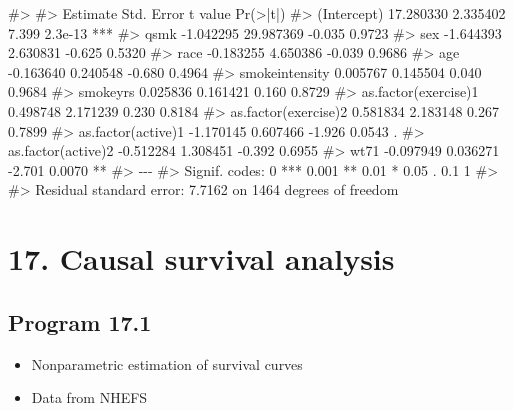 \documentclass[
  10pt,
  a4paper,
]{book}
\newenvironment{Shaded}{\begin{snugshade}}{\end{snugshade}}
\newcommand{\CommentTok}[1]{\textcolor[rgb]{0.37,0.37,0.37}{#1}}
\providecommand{\tightlist}{%
  \setlength{\itemsep}{0pt}\setlength{\parskip}{0pt}}
\begin{document}
\begin{Shaded}
\begin{Highlighting}[]
\CommentTok{\#\textgreater{} }
\CommentTok{\#\textgreater{}                       Estimate Std. Error t value Pr(\textgreater{}|t|)    }
\CommentTok{\#\textgreater{} (Intercept)          17.280330   2.335402   7.399  2.3e{-}13 ***}
\CommentTok{\#\textgreater{} qsmk                 {-}1.042295  29.987369  {-}0.035   0.9723    }
\CommentTok{\#\textgreater{} sex                  {-}1.644393   2.630831  {-}0.625   0.5320    }
\CommentTok{\#\textgreater{} race                 {-}0.183255   4.650386  {-}0.039   0.9686    }
\CommentTok{\#\textgreater{} age                  {-}0.163640   0.240548  {-}0.680   0.4964    }
\CommentTok{\#\textgreater{} smokeintensity        0.005767   0.145504   0.040   0.9684    }
\CommentTok{\#\textgreater{} smokeyrs              0.025836   0.161421   0.160   0.8729    }
\CommentTok{\#\textgreater{} as.factor(exercise)1  0.498748   2.171239   0.230   0.8184    }
\CommentTok{\#\textgreater{} as.factor(exercise)2  0.581834   2.183148   0.267   0.7899    }
\CommentTok{\#\textgreater{} as.factor(active)1   {-}1.170145   0.607466  {-}1.926   0.0543 .  }
\CommentTok{\#\textgreater{} as.factor(active)2   {-}0.512284   1.308451  {-}0.392   0.6955    }
\CommentTok{\#\textgreater{} wt71                 {-}0.097949   0.036271  {-}2.701   0.0070 ** }
\CommentTok{\#\textgreater{} {-}{-}{-}}
\CommentTok{\#\textgreater{} Signif. codes:  0 \textquotesingle{}***\textquotesingle{} 0.001 \textquotesingle{}**\textquotesingle{} 0.01 \textquotesingle{}*\textquotesingle{} 0.05 \textquotesingle{}.\textquotesingle{} 0.1 \textquotesingle{} \textquotesingle{} 1}
\CommentTok{\#\textgreater{} }
\CommentTok{\#\textgreater{} Residual standard error: 7.7162 on 1464 degrees of freedom}
\end{Highlighting}
\end{Shaded}

\chapter*{17. Causal survival analysis}\label{causal-survival-analysis}

\section{Program 17.1}\label{program-17.1}

\begin{itemize}
\tightlist
\item
  Nonparametric estimation of survival curves
\item
  Data from NHEFS
\end{itemize}
\end{document}
